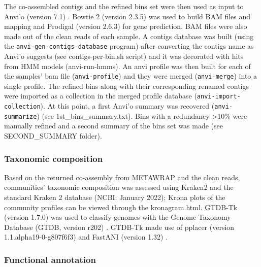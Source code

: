    The co-assembled contigs and the refined bins set were then used as input to Anvi’o (version 7.1) \citep{eren_anvio_2015}. 
   Bowtie 2 (version 2.3.5) \citep{langmead_fast_2012} was used to build BAM files and mapping and Prodigal (version 2.6.3) \citep{hyatt_prodigal_2010} for gene prediction. 
   BAM files were also made out of the clean reads of each sample. 
   A contigs database was built (using the \texttt{anvi-gen-contigs-database} program) after converting the contigs name as Anvi’o suggests (see contigs-per-bin.sh script) and it was decorated with hits from HMM models (anvi-run-hmms). 
   An anvi profile was then built for each of the samples’ bam file (\texttt{anvi-profile}) and they were merged (\texttt{anvi-merge}) into a single profile. 
   The refined bins along with their corresponding renamed contigs were imported as a collection in the merged profile database (\texttt{anvi-import-collection}). 
   At this point, a first Anvi’o summary was recovered (\texttt{anvi-summarize}) (see 1st\_bins\_summary.txt). 
   Bins with a redundancy >10\% were manually refined and a second summary of the bins set was made (see SECOND\_SUMMARY folder). 


\subsubsection*{Taxonomic composition}

   Based on the returned co-assembly from METAWRAP and the clean reads, communities’ taxonomic composition was assessed using  Kraken2 \citep{wood_improved_2019} and the standard Kraken 2 database (NCBI: January 2022); 
   Krona plots of the community profiles can be viewed through the kronagram.html. 
   GTDB-Tk (version 1.7.0) \citep{chaumeil_gtdb-tk_2020} was used to classify genomes with the Genome Taxonomy Database (GTDB, version r202) \citep{parks_gtdb_2022}. 
   GTDB-Tk made use of pplacer (version 1.1.alpha19-0-g807f6f3) \citep{matsen_pplacer_2010} and FastANI (version 1.32) \citep{jain_high_2018}.


\subsubsection*{Functional annotation}

